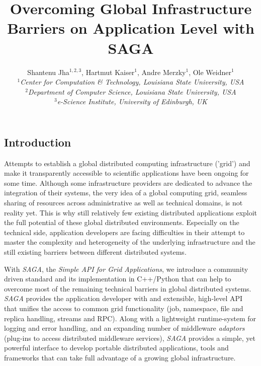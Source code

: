\documentclass[a4paper,10pt]{article}
\newcommand{\sagaimpl}{\textit{SAGA}\xspace}
\newcommand{\impl}{\sagaimpl}
\newcommand{\jhanote}[1]{  {\textcolor{red}     { ***Shantenu: #1 }}}
\newcommand{\jhanote}[1]{}
\begin{document}
 \title{ \Large \vspace{-3.5em} Overcoming Global Infrastructure Barriers on Application Level with SAGA }
 
 \author{Shantenu Jha$^{1,2,3}$, Hartmut Kaiser$^{1}$, Andre Merzky$^{1}$, Ole Weidner$^{1}$ \\
   \small{\emph{$^{1}$Center for Computation \& Technology, Louisiana State University, USA}}\\
   \small{\emph{$^{2}$Department of Computer Science, Louisiana State University, USA}}\\
   \small{\emph{$^{3}$e-Science Institute, University of Edinburgh, UK}}
 }
 \date{}
 \maketitle
 




\subsection*{Introduction}
\vspace{-0.5em}
Attempts to establish a global distributed computing infrastructure ('grid') and make it transparently accessible to scientific applications have been ongoing for some time. Although some infrastructure providers are dedicated to advance the integration of their systems, the very idea of a global computing grid, seamless sharing of resources across administrative as well as technical domains, is not reality yet. This is why still relatively few existing distributed applications exploit the full potential of these global distributed environments. Especially on the technical side, application developers are facing difficulties in their attempt to master the complexity and heterogeneity of the underlying infrastructure and the still existing barriers between different distributed systems.

With \impl, the \textit{Simple API for Grid Applications}, we introduce a community driven standard and its implementation in C++/Python that can help to overcome most of the remaining technical barriers in global distributed systems. \impl provides the application developer with and extensible, high-level API that unifies the access to common grid functionality (job, namespace, file and replica handling, streams and RPC). Along with a lightweight runtime-system for logging and error handling, and an expanding number of middleware \textit{adaptors} (plug-ins to access distributed middleware services), \impl provides a simple, yet powerful interface to develop portable distributed applications, tools and frameworks that can take full advantage of a growing global infrastructure.
\end{document}

